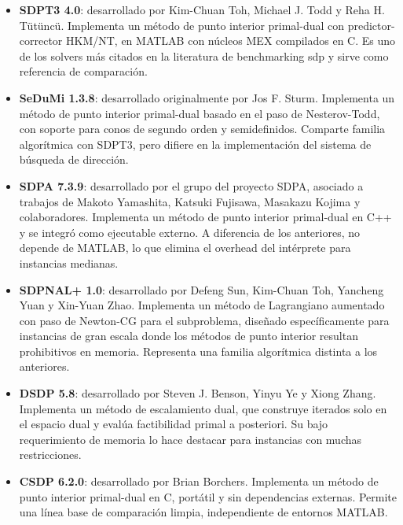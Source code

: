 \begin{itemize}
    \item \textbf{SDPT3 4.0}\cite{tohImplementationUsageSDPT32012a}: desarrollado por Kim-Chuan Toh,
    Michael J. Todd y Reha H. Tütüncü. Implementa un método de punto interior primal-dual con
    predictor-corrector HKM/NT, en MATLAB con núcleos MEX compilados en C. Es uno de los solvers
    más citados en la literatura de benchmarking \acrshort{sdp} y sirve como referencia de comparación.

    \item \textbf{SeDuMi 1.3.8}\cite{sturmUSINGSEDUMI1022001}: desarrollado originalmente por Jos F. Sturm.
    Implementa un método de punto interior primal-dual basado en el paso de Nesterov-Todd, con soporte
    para conos de segundo orden y semidefinidos. Comparte familia algorítmica con SDPT3, pero difiere
    en la implementación del sistema de búsqueda de dirección.

    \item \textbf{SDPA 7.3.9}\cite{SDPAOfficialPage}: desarrollado por el grupo del proyecto SDPA, asociado
    a trabajos de Makoto Yamashita, Katsuki Fujisawa, Masakazu Kojima y colaboradores. Implementa un
    método de punto interior primal-dual en C++ y se integró como ejecutable externo. A diferencia de los
    anteriores, no depende de MATLAB, lo que elimina el overhead del intérprete para instancias medianas.

    \item \textbf{SDPNAL+ 1.0}\cite{sunSDPNALMatlabSoftware2019}: desarrollado por Defeng Sun, Kim-Chuan Toh, Yancheng Yuan y
    Xin-Yuan Zhao. Implementa un método de Lagrangiano aumentado con paso de Newton-CG para el
    subproblema, diseñado específicamente para instancias de gran escala donde los métodos de punto
    interior resultan prohibitivos en memoria. Representa una familia algorítmica distinta a los anteriores.

    \item \textbf{DSDP 5.8}\cite{bensonAlgorithm875DSDP5software2008}: desarrollado por Steven J. Benson,
    Yinyu Ye y Xiong Zhang. Implementa un método de escalamiento dual, que construye iterados solo en
    el espacio dual y evalúa factibilidad primal a posteriori. Su bajo requerimiento de memoria lo hace
    destacar para instancias con muchas restricciones.

    \item \textbf{CSDP 6.2.0}\cite{borchersCSDPLibrarySemidefinite1999}: desarrollado por Brian Borchers. Implementa
    un método de punto interior primal-dual en C, portátil y sin dependencias externas. Permite una línea
    base de comparación limpia, independiente de entornos MATLAB.
\end{itemize}

